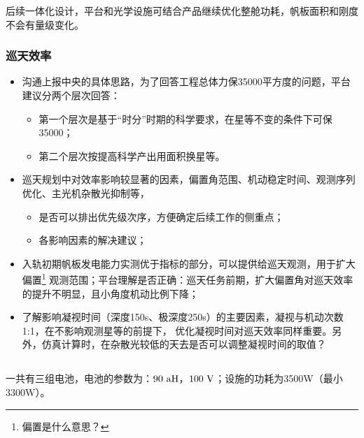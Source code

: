 后续一体化设计，平台和光学设施可结合产品继续优化整舱功耗，帆板面积和刚度不会有量级变化。

\subsubsection{巡天效率}
\begin{itemize}
\item[1] 沟通上报中央的具体思路，为了回答工程总体力保35000平方度的问题，平台建议分两个层次回答：
    \begin{itemize}
	\item 第一个层次是基于“时分”时期的科学要求，在星等不变的条件下可保35000；
	\item 第二个层次按提高科学产出用面积换星等。
    \end{itemize}
\item[2] 巡天规划中对效率影响较显著的因素，偏置角范围、机动稳定时间、观测序列优化、主光机杂散光抑制等，
    \begin{itemize}
	\item 是否可以排出优先级次序，方便确定后续工作的侧重点；
	\item 各影响因素的解决建议；
    \end{itemize}
\item[3] 入轨初期帆板发电能力实测优于指标的部分，可以提供给巡天观测，用于扩大偏置\footnote{偏置是什么意思？}
观测范围；平台理解是否正确：巡天任务前期，扩大偏置角对巡天效率的提升不明显，且小角度机动比例下降；
\item[4] 了解影响凝视时间（深度150s、极深度250s）的主要因素，凝视与机动次数1:1，在不影响观测星等的前提下，
优化凝视时间对巡天效率同样重要。另外，仿真计算时，在杂散光较低的天去是否可以调整凝视时间的取值？
\end{itemize}

\subsection{}
一共有三组电池，电池的参数为：$90~\rm{aH}$，$100~\rm{V}$；设施的功耗为3500W（最小3300W）。


